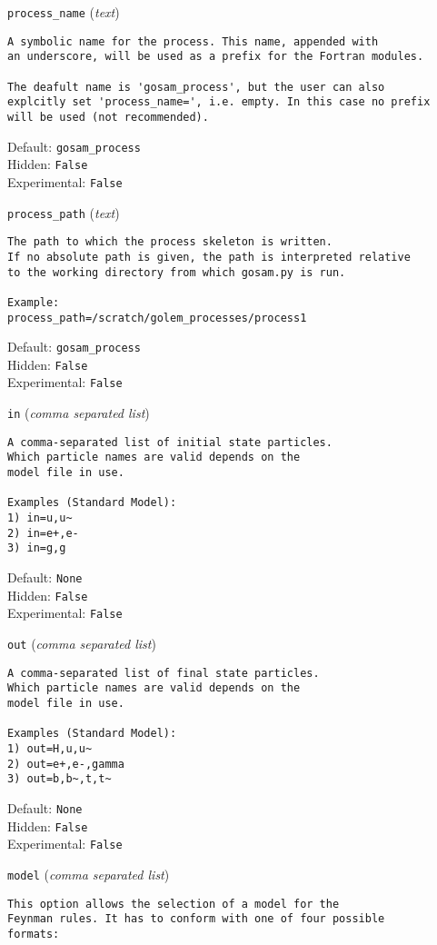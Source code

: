 \begin{basedescript}{\desclabelstyle{\pushlabel}}
\setlength\itemsep{30pt}
\item[\colorbox{gray!30}{\texttt{process\_name}}] (\textit{text})
\begin{verbatim}
A symbolic name for the process. This name, appended with
an underscore, will be used as a prefix for the Fortran modules.

The deafult name is 'gosam_process', but the user can also
explcitly set 'process_name=', i.e. empty. In this case no prefix
will be used (not recommended).
\end{verbatim}
Default: \verb|gosam_process|
\\Hidden: \verb|False|
\\Experimental: \verb|False|
\\\item[\colorbox{gray!30}{\texttt{process\_path}}] (\textit{text})
\begin{verbatim}
The path to which the process skeleton is written.
If no absolute path is given, the path is interpreted relative
to the working directory from which gosam.py is run.

Example:
process_path=/scratch/golem_processes/process1
\end{verbatim}
Default: \verb|gosam_process|
\\Hidden: \verb|False|
\\Experimental: \verb|False|
\\\item[\colorbox{gray!30}{\texttt{in}}] (\textit{comma separated list})
\begin{verbatim}
A comma-separated list of initial state particles.
Which particle names are valid depends on the
model file in use.

Examples (Standard Model):
1) in=u,u~
2) in=e+,e-
3) in=g,g
\end{verbatim}
Default: \verb|None|
\\Hidden: \verb|False|
\\Experimental: \verb|False|
\\\item[\colorbox{gray!30}{\texttt{out}}] (\textit{comma separated list})
\begin{verbatim}
A comma-separated list of final state particles.
Which particle names are valid depends on the
model file in use.

Examples (Standard Model):
1) out=H,u,u~
2) out=e+,e-,gamma
3) out=b,b~,t,t~
\end{verbatim}
Default: \verb|None|
\\Hidden: \verb|False|
\\Experimental: \verb|False|
\\\item[\colorbox{gray!30}{\texttt{model}}] (\textit{comma separated list})
\begin{verbatim}
This option allows the selection of a model for the
Feynman rules. It has to conform with one of four possible
formats:


\end{verbatim}
\end{basedescript}
